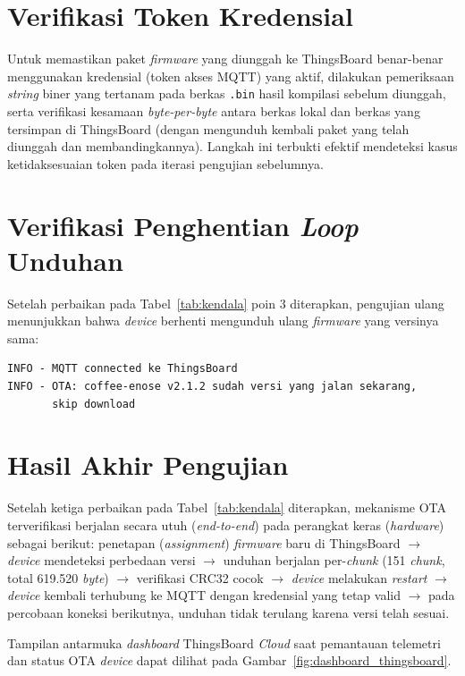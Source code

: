 \documentclass[12pt,a4paper]{report}
\begin{document}
\section{Verifikasi Token Kredensial}
Untuk memastikan paket \textit{firmware} yang diunggah ke ThingsBoard benar-benar
menggunakan kredensial (token akses MQTT) yang aktif, dilakukan pemeriksaan \textit{string}
biner yang tertanam pada berkas \texttt{.bin} hasil kompilasi sebelum diunggah,
serta verifikasi kesamaan \textit{byte-per-byte} antara berkas lokal dan berkas yang
tersimpan di ThingsBoard (dengan mengunduh kembali paket yang telah diunggah dan
membandingkannya). Langkah ini terbukti efektif mendeteksi kasus ketidaksesuaian
token pada iterasi pengujian sebelumnya.

\section{Verifikasi Penghentian \textit{Loop} Unduhan}
Setelah perbaikan pada Tabel~\ref{tab:kendala} poin 3 diterapkan, pengujian ulang
menunjukkan bahwa \textit{device} berhenti mengunduh ulang \textit{firmware} yang versinya sama:

\begin{lstlisting}[caption={Log setelah perbaikan -- unduhan otomatis di-skip}]
INFO - MQTT connected ke ThingsBoard
INFO - OTA: coffee-enose v2.1.2 sudah versi yang jalan sekarang,
       skip download
\end{lstlisting}

\section{Hasil Akhir Pengujian}
Setelah ketiga perbaikan pada Tabel~\ref{tab:kendala} diterapkan, mekanisme OTA
terverifikasi berjalan secara utuh (\textit{end-to-end}) pada perangkat keras (\textit{hardware})
sebagai berikut: penetapan (\textit{assignment}) \textit{firmware} baru di ThingsBoard
$\rightarrow$ \textit{device} mendeteksi perbedaan versi $\rightarrow$ unduhan berjalan
per-\textit{chunk} (151 \textit{chunk}, total 619.520 \textit{byte}) $\rightarrow$ verifikasi
CRC32 cocok $\rightarrow$ \textit{device} melakukan \textit{restart} $\rightarrow$ \textit{device}
kembali terhubung ke MQTT dengan kredensial yang tetap valid $\rightarrow$ pada
percobaan koneksi berikutnya, unduhan tidak terulang karena versi telah sesuai.

Tampilan antarmuka \textit{dashboard} ThingsBoard \textit{Cloud} saat pemantauan telemetri dan status OTA \textit{device} dapat dilihat pada Gambar~\ref{fig:dashboard_thingsboard}.
\end{document}
